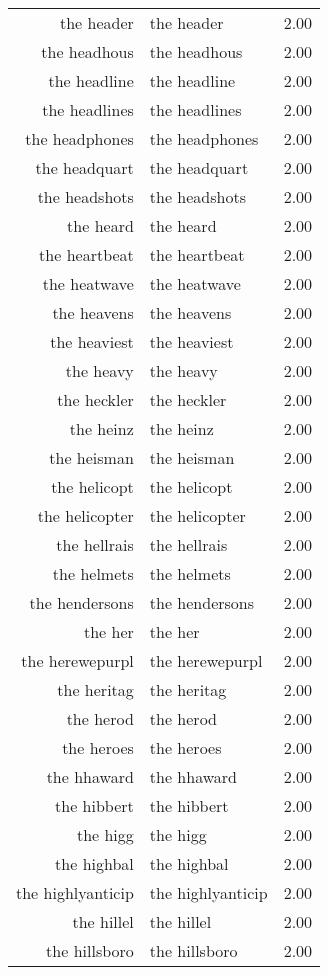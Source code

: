 \begin{table}[ht]
\begin{tabular}{rlr}
  the header & the header & 2.00 \\ 
  the headhous & the headhous & 2.00 \\ 
  the headline & the headline & 2.00 \\ 
  the headlines & the headlines & 2.00 \\ 
  the headphones & the headphones & 2.00 \\ 
  the headquart & the headquart & 2.00 \\ 
  the headshots & the headshots & 2.00 \\ 
  the heard & the heard & 2.00 \\ 
  the heartbeat & the heartbeat & 2.00 \\ 
  the heatwave & the heatwave & 2.00 \\ 
  the heavens & the heavens & 2.00 \\ 
  the heaviest & the heaviest & 2.00 \\ 
  the heavy & the heavy & 2.00 \\ 
  the heckler & the heckler & 2.00 \\ 
  the heinz & the heinz & 2.00 \\ 
  the heisman & the heisman & 2.00 \\ 
  the helicopt & the helicopt & 2.00 \\ 
  the helicopter & the helicopter & 2.00 \\ 
  the hellrais & the hellrais & 2.00 \\ 
  the helmets & the helmets & 2.00 \\ 
  the hendersons & the hendersons & 2.00 \\ 
  the her & the her & 2.00 \\ 
  the herewepurpl & the herewepurpl & 2.00 \\ 
  the heritag & the heritag & 2.00 \\ 
  the herod & the herod & 2.00 \\ 
  the heroes & the heroes & 2.00 \\ 
  the hhaward & the hhaward & 2.00 \\ 
  the hibbert & the hibbert & 2.00 \\ 
  the higg & the higg & 2.00 \\ 
  the highbal & the highbal & 2.00 \\ 
  the highlyanticip & the highlyanticip & 2.00 \\ 
  the hillel & the hillel & 2.00 \\ 
  the hillsboro & the hillsboro & 2.00 \\ 

\end{tabular}
\end{table}
